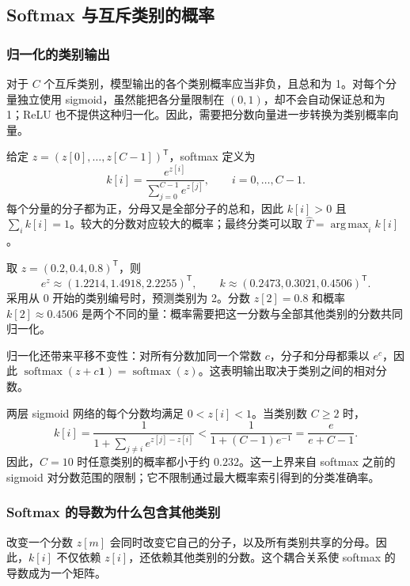 \subsection{Softmax 与互斥类别的概率}

\subsubsection{归一化的类别输出}
对于 $C$ 个互斥类别，模型输出的各个类别概率应当非负，且总和为 1。对每个分量独立使用 sigmoid，虽然能把各分量限制在 $(0,1)$，却不会自动保证总和为 1；ReLU 也不提供这种归一化。因此，需要把分数向量进一步转换为类别概率向量。

给定 $z=(z[0],\ldots,z[C-1])^{\mathsf T}$，softmax 定义为
\begin{equation}
 k[i]=\frac{e^{z[i]}}{\sum_{j=0}^{C-1}e^{z[j]}},
 \qquad i=0,\ldots,C-1.
 \label{l10:eq:softmax}
\end{equation}
每个分量的分子都为正，分母又是全部分子的总和，因此 $k[i]>0$ 且 $\sum_i k[i]=1$。较大的分数对应较大的概率；最终分类可以取 $\widehat T=\operatorname*{arg\,max}_i k[i]$。

取 $z=(0.2,0.4,0.8)^{\mathsf T}$，则
\begin{equation}
 e^z\approx(1.2214,1.4918,2.2255)^{\mathsf T},\qquad
 k\approx(0.2473,0.3021,0.4506)^{\mathsf T}.
\end{equation}
采用从 0 开始的类别编号时，预测类别为 2。分数 $z[2]=0.8$ 和概率 $k[2]\approx0.4506$ 是两个不同的量：概率需要把这一分数与全部其他类别的分数共同归一化。

归一化还带来平移不变性：对所有分数加同一个常数 $c$，分子和分母都乘以 $e^c$，因此 $\operatorname{softmax}(z+c\mathbf{1})=\operatorname{softmax}(z)$。这表明输出取决于类别之间的相对分数。

\begin{keybox}[title={有界分数对概率范围的限制}]
两层 sigmoid 网络的每个分数均满足 $0<z[i]<1$。当类别数 $C\ge2$ 时，
\[
 k[i]=\frac{1}{1+\sum_{j\ne i}e^{z[j]-z[i]}}
 <\frac{1}{1+(C-1)e^{-1}}
 =\frac{e}{e+C-1}.
\]
因此，$C=10$ 时任意类别的概率都小于约 $0.232$。这一上界来自 softmax 之前的 sigmoid 对分数范围的限制；它不限制通过最大概率索引得到的分类准确率。
\end{keybox}

\subsubsection{Softmax 的导数为什么包含其他类别}
改变一个分数 $z[m]$ 会同时改变它自己的分子，以及所有类别共享的分母。因此，$k[i]$ 不仅依赖 $z[i]$，还依赖其他类别的分数。这个耦合关系使 softmax 的导数成为一个矩阵。

